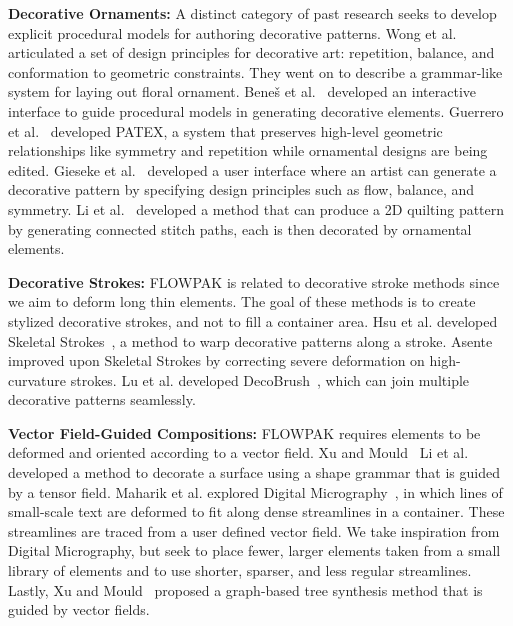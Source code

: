 
\newtext
{
\textbf{Decorative Ornaments:} A distinct category of past research seeks to develop explicit procedural
models for authoring decorative patterns.  Wong et al.~\cite{Wong1998}
articulated a set of design principles for decorative art:
repetition, balance, and conformation to geometric constraints.  They
went on to describe a grammar-like system for laying out floral ornament.
Bene\v{s} et al.~\cite{Benes2011} developed an interactive 
interface to guide procedural models in generating decorative elements.
Guerrero et al.~\cite{Guerrero2016} developed PATEX, a system that preserves high-level geometric relationships
like symmetry and repetition while ornamental designs are being edited.
Gieseke et al.~\cite{Gieseke2017} developed a user interface where an artist 
can generate a decorative pattern by specifying design principles such as flow, balance, and symmetry.
Li et al.~\cite{Li2019} developed a method that can produce a 2D quilting pattern
by generating connected stitch paths, 
each is then decorated by ornamental elements.
}

\newtext
{
\textbf{Decorative Strokes:}
FLOWPAK is related to decorative stroke methods since we aim to deform long thin elements. 
The goal of these methods is to create stylized decorative strokes, and not to fill a container area. 
Hsu et al. developed Skeletal Strokes~\cite{Hsu1993}, a method to warp decorative patterns along a stroke.
Asente~\cite{Asente2010} improved upon Skeletal Strokes by correcting severe deformation on high-curvature strokes.
Lu et al. developed DecoBrush~\cite{Lu2014}, which can join multiple decorative patterns seamlessly.
}

\newtext
{
\textbf{Vector Field-Guided Compositions:} 
FLOWPAK requires elements to be deformed and oriented according to a vector field.
Xu and Mould~\cite{Xu2009} 
Li et al.~\cite{Li2010} developed a method to decorate a surface using a shape grammar that is guided by a tensor field.
Maharik et al. explored Digital Micrography~\cite{Maharik2011}, in which
lines of small-scale text are deformed to fit along dense streamlines in a container.
These streamlines are traced from a user defined vector field.
We take inspiration from Digital Micrography, but seek to place fewer,
larger elements taken from a small library of elements and to use shorter, sparser, and less regular streamlines. 
Lastly, Xu and Mould~\cite{Xu2015} proposed a graph-based tree synthesis method that is guided by vector fields.
}

